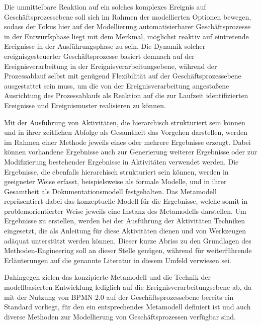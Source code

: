 Die unmittelbare Reaktion auf ein solches komplexes Ereignis auf Geschäftsprozessebene soll sich im Rahmen der modellierten Optionen bewegen, sodass der Fokus hier auf der Modellierung automatisierbarer Geschäftsprozesse in der Entwurfsphase liegt mit dem Merkmal, möglichst reaktiv auf eintretende Ereignisse in der Ausführungsphase zu sein. Die Dynamik solcher ereignisgesteuerter Geschäftsprozesse basiert demnach auf der Ereignisverarbeitung in der Ereignisverarbeitungsebene, während der Prozessablauf selbst mit genügend Flexibilität auf der Geschäftsprozessebene ausgestattet sein muss, um die von der Ereignisverarbeitung angestoßene Ausrichtung des Prozessablaufs als Reaktion auf die zur Laufzeit identifizierten Ereignisse und Ereignismuster realisieren zu können.

Mit der Ausführung von Aktivitäten, die hierarchisch strukturiert sein können und in ihrer zeitlichen Abfolge als Gesamtheit das Vorgehen darstellen, werden im Rahmen einer Methode jeweils eines oder mehrere Ergebnisse erzeugt. Dabei können vorhandene Ergebnisse auch zur Generierung weiterer Ergebnisse oder zur Modifizierung bestehender Ergebnisse in Aktivitäten verwendet werden. 
Die Ergebnisse, die ebenfalls hierarchisch strukturiert sein können, werden in geeigneter Weise erfasst, beispielsweise als formale Modelle, und in ihrer Gesamtheit als Dokumentationsmodell festgehalten. Das Metamodell repräsentiert dabei das konzeptuelle Modell für die Ergebnisse, welche somit in problemorientierter Weise jeweils eine Instanz des Metamodells darstellen. Um Ergebnisse zu erstellen, werden bei der Ausführung der Aktivitäten Techniken eingesetzt, die als Anleitung für diese Aktivitäten dienen und von Werkzeugen adäquat unterstützt werden können. Dieser kurze Abriss zu den Grundlagen des Methoden-Engineering soll an dieser Stelle genügen, während für weiterführende Erläuterungen auf die genannte Literatur in diesem Umfeld verwiesen sei.

Dahingegen zielen das konzipierte Metamodell und die Technik der modellbasierten Entwicklung lediglich auf die Ereignisverarbeitungsebene ab, da mit der Nutzung von BPMN 2.0 auf der Geschäftsprozessebene bereits ein Standard vorliegt, für den ein entsprechendes Metamodell definiert ist und auch diverse Methoden zur Modellierung von Geschäftsprozessen verfügbar sind.

\cite{JorgBecker.2001}

